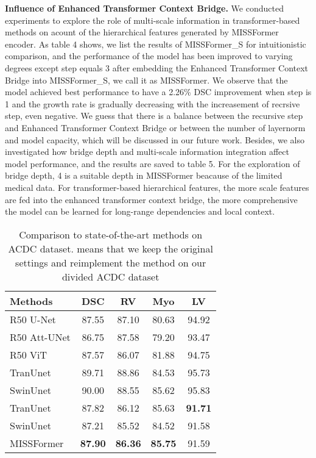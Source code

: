 \documentclass[letterpaper]{article} \usepackage{aaai22}  \usepackage{times}  \usepackage{helvet}  \usepackage{courier}  \usepackage[hyphens]{url}  \usepackage{graphicx} \urlstyle{rm} \def\UrlFont{\rm}  \usepackage{natbib}  \usepackage{caption} \DeclareCaptionStyle{ruled}{labelfont=normalfont,labelsep=colon,strut=off} \frenchspacing  \setlength{\pdfpagewidth}{8.5in}  \setlength{\pdfpageheight}{11in}  \usepackage{algorithm}
\begin{document}
\textbf{Influence of Enhanced Transformer Context Bridge.} We conducted experiments to explore the role of multi-scale information in transformer-based methods on acount of the hierarchical features generated by MISSFormer encoder. As table 4 shows, we list the results of MISSFormer\_S for intuitionistic comparison, and the performance of the model has been improved to varying degrees except step equals 3 after embedding the Enhanced Transformer Context Bridge into MISSFormer\_S, we call it as MISSFormer. We observe that the model achieved best performance to have a 2.26\% DSC improvement when step is 1 and the growth rate is gradually decreasing with the increasement of recrsive step, even negative. We guess that there is a balance between the recursive step and Enhanced Transformer Context Bridge or between the number of layernorm and model capacity, which will be discussed in our future work. Besides, we also investigated how bridge depth and multi-scale information integration affect model performance, and the results are saved to table 5. For the exploration of bridge depth, 4 is a suitable depth in MISSFormer beacause of the limited medical data. For transformer-based hierarchical features, the more scale features are fed into the enhanced transformer context bridge, the more comprehensive the model can be learned for long-range dependencies and local context.
\begin{table}[t]
	\centering
	\begin{tabular}{l|c|c|c|c}
		\hline
		Methods & DSC & RV & Myo & LV \\
		\hline
		\hline
R50 U-Net&87.55&87.10& 80.63& 94.92	\\
		R50 Att-UNet& 86.75&87.58& 79.20& 93.47	\\
		R50 ViT& 87.57&86.07&81.88&94.75	\\
		TranUnet&89.71&88.86& 84.53&95.73\\
		SwinUnet& 90.00&88.55& 85.62& 95.83	\\
		\hline
		TranUnet &87.82&86.12& 85.63&\textbf{91.71}\\
		SwinUnet & 87.21 &85.52&84.52 & 91.58	\\
		\hline
		MISSFormer& \textbf{87.90} & \textbf{86.36}  &\textbf{85.75}   &91.59\\
		\hline	
	\end{tabular}
	\caption{Comparison to state-of-the-art methods on ACDC dataset.  means that we keep the original settings and reimplement the method on our divided ACDC dataset }
	\label{table7}
\end{table}
\end{document}
